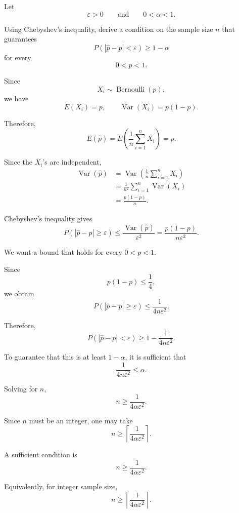 \documentclass[11pt]{article}
\begin{document}
Let
\[
\varepsilon>0
\qquad\text{and}\qquad
0<\alpha<1.
\]

Using Chebyshev's inequality, derive a condition on the sample size \(n\) that
guarantees
\[
P\left(|\widehat p-p|<\varepsilon\right)
\geq
1-\alpha
\]
for every
\[
0<p<1.
\]

\begin{solutionbox}

Since
\[
X_i\sim\operatorname{Bernoulli}(p),
\]
we have
\[
E(X_i)=p,
\qquad
\operatorname{Var}(X_i)=p(1-p).
\]

Therefore,
\[
E(\widehat p)
=
E\left(
\frac1n\sum_{i=1}^nX_i
\right)
=
p.
\]

Since the \(X_i\)'s are independent,
\begin{align*}
\operatorname{Var}(\widehat p)
&=
\operatorname{Var}
\left(
\frac1n\sum_{i=1}^nX_i
\right)\\
&=
\frac1{n^2}
\sum_{i=1}^n
\operatorname{Var}(X_i)\\
&=
\frac{p(1-p)}{n}.
\end{align*}

Chebyshev's inequality gives
\[
P\left(
|\widehat p-p|\geq\varepsilon
\right)
\leq
\frac{\operatorname{Var}(\widehat p)}
{\varepsilon^2}
=
\frac{p(1-p)}{n\varepsilon^2}.
\]

We want a bound that holds for every \(0<p<1\).

Since
\[
p(1-p)\leq\frac14,
\]
we obtain
\[
P\left(
|\widehat p-p|\geq\varepsilon
\right)
\leq
\frac{1}{4n\varepsilon^2}.
\]

Therefore,
\[
P\left(
|\widehat p-p|<\varepsilon
\right)
\geq
1-\frac{1}{4n\varepsilon^2}.
\]

To guarantee that this is at least \(1-\alpha\), it is sufficient that
\[
\frac{1}{4n\varepsilon^2}
\leq
\alpha.
\]

Solving for \(n\),
\[
n
\geq
\frac{1}{4\alpha\varepsilon^2}.
\]

Since \(n\) must be an integer, one may take
\[
n
\geq
\left\lceil
\frac{1}{4\alpha\varepsilon^2}
\right\rceil.
\]

\begin{finalanswerbox}

A sufficient condition is
\[
n
\geq
\frac{1}{4\alpha\varepsilon^2}.
\]

Equivalently, for integer sample size,
\[
n
\geq
\left\lceil
\frac{1}{4\alpha\varepsilon^2}
\right\rceil.
\]

\end{finalanswerbox}

\end{solutionbox}
\end{document}

